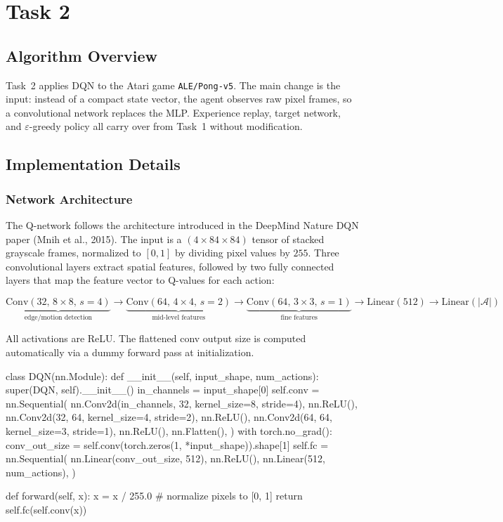 \documentclass[12pt,a4paper]{report}
\begin{document}
\newpage

\section{Task 2}

\subsection{Algorithm Overview}

Task~2 applies DQN to the Atari game \texttt{ALE/Pong-v5}.
The main change is the input: instead of a compact state vector, the agent observes raw
pixel frames, so a convolutional network replaces the MLP.
Experience replay, target network, and $\varepsilon$-greedy policy all carry over from
Task~1 without modification.

\subsection{Implementation Details}

\subsubsection*{Network Architecture}

The Q-network follows the architecture introduced in the DeepMind Nature DQN paper
(Mnih et al., 2015).
The input is a $(4 \times 84 \times 84)$ tensor of stacked grayscale frames,
normalized to $[0, 1]$ by dividing pixel values by $255$.
Three convolutional layers extract spatial features, followed by two fully connected layers
that map the feature vector to Q-values for each action:

\[
  \underbrace{\text{Conv}(32,\,8{\times}8,\,s{=}4)}_{\text{edge/motion detection}}
  \to
  \underbrace{\text{Conv}(64,\,4{\times}4,\,s{=}2)}_{\text{mid-level features}}
  \to
  \underbrace{\text{Conv}(64,\,3{\times}3,\,s{=}1)}_{\text{fine features}}
  \to
  \text{Linear}(512)
  \to
  \text{Linear}(|\mathcal{A}|)
\]

All activations are ReLU. The flattened conv output size is computed automatically
via a dummy forward pass at initialization.

\begin{pycode}
class DQN(nn.Module):
    def __init__(self, input_shape, num_actions):
        super(DQN, self).__init__()
        in_channels = input_shape[0]
        self.conv = nn.Sequential(
            nn.Conv2d(in_channels, 32, kernel_size=8, stride=4), nn.ReLU(),
            nn.Conv2d(32, 64, kernel_size=4, stride=2),          nn.ReLU(),
            nn.Conv2d(64, 64, kernel_size=3, stride=1),          nn.ReLU(),
            nn.Flatten(),
        )
        with torch.no_grad():
            conv_out_size = self.conv(torch.zeros(1, *input_shape)).shape[1]
        self.fc = nn.Sequential(
            nn.Linear(conv_out_size, 512), nn.ReLU(),
            nn.Linear(512, num_actions),
        )

    def forward(self, x):
        x = x / 255.0          # normalize pixels to [0, 1]
        return self.fc(self.conv(x))
\end{pycode}
\end{document}
